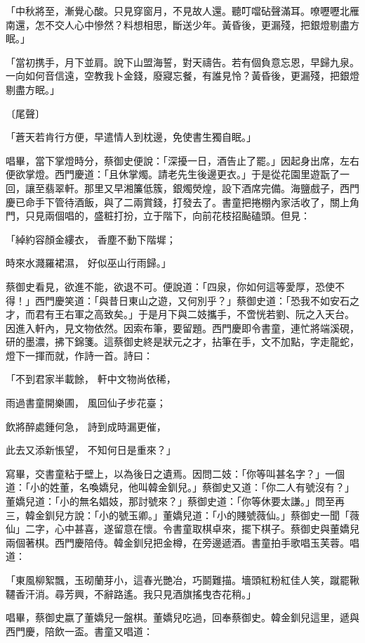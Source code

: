 「中秋將至，漸覺心酸。只見穿窗月，不見故人還。聽叮噹砧聲滿耳。嘹嚦嚦北雁南還，怎不交人心中慘然？料想相思，斷送少年。黃昏後，更漏殘，把銀燈剔盡方眠。」

「當初携手，月下並肩。說下山盟海誓，對天禱告。若有個負意忘恩，早歸九泉。一向如何音信遠，空教我卜金錢，廢寢忘餐，有誰見怜？黃昏後，更漏殘，把銀燈剔盡方眠。」

〔尾聲〕

「蒼天若肯行方便，早遣情人到枕邊，免使書生獨自眠。」

唱畢，當下掌燈時分，蔡御史便說：「深擾一日，酒告止了罷。」因起身出席，左右便欲掌燈。西門慶道：「且休掌燭。請老先生後邊更衣。」于是從花園里遊翫了一回，讓至翡翠軒。那里又早湘簾低簇，銀燭熒煌，設下酒席完備。海鹽戲子，西門慶已命手下管待酒飯，與了二兩賞錢，打發去了。書童把捲棚內家活收了，關上角門，只見兩個唱的，盛粧打扮，立于階下，向前花枝招颭磕頭。但見：

「綽約容顏金縷衣， 香塵不動下階墀；

時來水濺羅裙濕， 好似巫山行雨歸。」

蔡御史看見，欲進不能，欲退不可。便說道：「四泉，你如何這等愛厚，恐使不得！」西門慶笑道：「與昔日東山之遊，又何別乎？」蔡御史道：「恐我不如安石之才，而君有王右軍之高致矣。」于是月下與二妓攜手，不啻恍若劉、阮之入天台。因進入軒內，見文物依然。因索布筆，要留題。西門慶即令書童，連忙將端溪硯，研的墨濃，拂下錦箋。這蔡御史終是狀元之才，拈筆在手，文不加點，字走龍蛇，燈下一揮而就，作詩一首。詩曰：

「不到君家半載餘，  軒中文物尚依稀，

雨過書童開樂圃，  風回仙子步花臺；

飲將醉處鍾何急，  詩到成時漏更催，

此去又添新悵望，  不知何日是重來？」

寫畢，交書童粘于壁上，以為後日之遺焉。因問二妓：「你等叫甚名字？」一個道：「小的姓董，名喚嬌兒，他叫韓金釧兒。」蔡御史又道：「你二人有號沒有？」董嬌兒道：「小的無名娼妓，那討號來？」蔡御史道：「你等休要太謙。」問至再三，韓金釧兒方說：「小的號玉卿。」董嬌兒道：「小的賤號薇仙。」蔡御史一聞「薇仙」二字，心中甚喜，遂留意在懷。令書童取棋卓來，擺下棋子。蔡御史與董嬌兒兩個著棋。西門慶陪侍。韓金釧兒把金樽，在旁邊遞酒。書童拍手歌唱玉芙蓉。唱道：

「東風柳絮飄，玉砌蘭芽小，這春光艷冶，巧鬬難描。墻頭紅粉紅佳人笑，蹴罷鞦韆香汗消。尋芳興，不辭路遙。我只見酒旗搖曳杏花稍。」

唱畢，蔡御史嬴了董嬌兒一盤棋。董嬌兒吃過，回奉蔡御史。韓金釧兒這里，遞與西門慶，陪飲一盃。書童又唱道：

